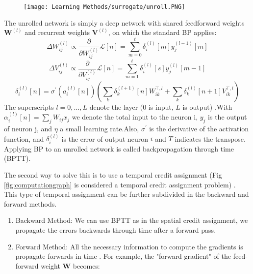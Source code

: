 \documentclass[12pt]{report}
\begin{document}
\begin{figure}[htp]
    \centering
    \texttt{[image: Learning Methods/surrogate/unroll.PNG]}
    \caption{}
    \label{fig:unroll}
\end{figure}

The unrolled network is simply a deep network with shared feedforward weights $\mathbf{W}^{(l)}$ and recurrent weights $\mathbf{V}^{(l)}$, on which the standard BP applies:
\begin{equation}
\Delta W_{i j}^{(l)} \propto \frac{\partial}{\partial W_{i j}^{(l)}} \mathcal{L}[n]=\sum_{m=0}^{t} \delta_{i}^{(l)}[m] y_{j}^{(l-1)}[m]
\end{equation}
\begin{equation}
\Delta V_{i j}^{(l)} \propto \frac{\partial}{\partial V_{i j}^{(l)}} \mathcal{L}[n]=\sum_{m=1}^{t} \delta_{i}^{(l)}[s] y_{j}^{(l)}[m-1]
\end{equation}
\begin{equation}
\delta_{i}^{(l)}[n]=\sigma^{\prime}\left(a_{i}^{(l)}[n]\right)\left(\sum_{k} \delta_{k}^{(l+1)}[n] W_{i k}^{\top, l}+\sum_{k} \delta_{k}^{(l)}[n+1] V_{i k}^{\top, l}\right)
\end{equation}
The superscripts $l=0, \ldots, L$ denote the layer $(0$ is input, $L$ is output) .With $\alpha_{i}^{(l)}[n]=\sum_{j} W_{i j} x_{j}$ we denote the total input to the neuron i, $y_{j}$ is the output of neuron j, and $\eta$ a small learning rate.Also, $\sigma^{\prime}$ is the derivative of the activation function, and $\delta_{i}^{(l)}$ is the error of output neuron $i$ and $T$ indicates the transpose. Applying BP to an unrolled network is called backpropagation through time (BPTT).

The second way to solve this is to use a temporal credit assignment (Fig \ref{fig:computationgraph} is considered a temporal credit assignment problem) . This type of temporal assignment can be further subdivided in the backward and forward methods.
\begin{enumerate}
  
    \item Backward Method: We can use BPTT as in the spatial credit assignment, we propagate the errors backwards through time after a forward pass.
    \item Forward Method: All the necessary information to compute the gradients is propagate forwards in time \cite{williams1989} .  For example, the "forward gradient" of the feed-forward weight $\mathbf{W}$ becomes:
\end{enumerate}
\end{document}
